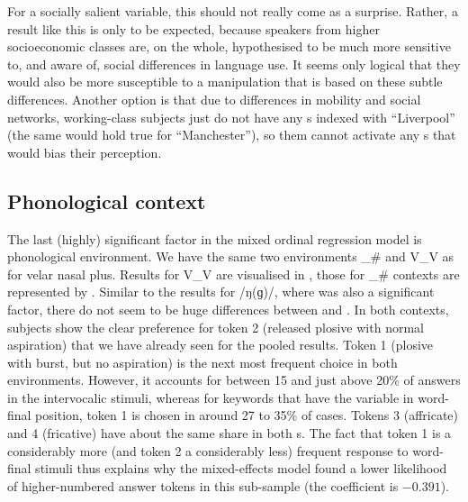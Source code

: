 For a socially salient variable, this should not really come as a surprise.
Rather, a result like this is only to be expected, because speakers from higher socioeconomic classes are, on the whole, hypothesised to be much more sensitive to, and aware of, social differences in language use.
It seems only logical that they would also be more susceptible to a manipulation that is based on these subtle differences.
Another option is that due to differences in mobility and social networks, working-class subjects just do not have any s indexed with ``Liverpool'' (the same would hold true for ``Manchester''), so  them cannot activate any s that would bias their perception.

\subsection{Phonological context}
\label{sec.perc_res.k.phon}

The last (highly) significant factor in the mixed ordinal regression model is phonological environment.
We have the same two environments \_\# and V\_V as for velar nasal plus.
Results for V\_V are visualised in , those for \_\# contexts are represented by .
Similar to the results for /ŋ(ɡ)/, where  was also a significant factor, there do not seem to be huge differences between  and .
In both contexts, subjects show the clear preference for token 2 (released plosive with normal aspiration) that we have already seen for the pooled results.
Token 1 (plosive with burst, but no aspiration) is the next most frequent choice in both environments.
However, it accounts for between 15 and just above 20\% of answers in the intervocalic stimuli, whereas for keywords that have the variable in word-final position, token 1 is chosen in around 27 to 35\% of cases.
Tokens 3 (affricate) and 4 (fricative) have about the same share in both s.
The fact that token 1 is a considerably more (and token 2 a considerably less) frequent response to word-final stimuli thus explains why the mixed-effects model found a lower likelihood of higher-numbered answer tokens in this sub-sample (the coefficient is \ensuremath{-0.391}).

